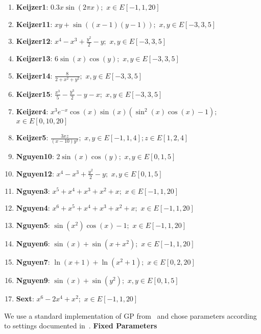 \begin{enumerate}[noitemsep]
\item \textbf{Keijzer1}: $0.3x \sin(2 \pi x);$ $x \in E[-1,1,20]$
\item \textbf{Keijzer11}: $x y+\sin((x-1)(y-1));$ $x, y \in E[-3,3,5]$
\item \textbf{Keijzer12}: $x^{4}-x^{3}+\frac{y^{2}}{2}-y;$ $x, y \in E[-3,3,5]$
\item \textbf{Keijzer13}: $6 \sin(x) \cos(y);$ $x, y \in E[-3,3,5]$
\item \textbf{Keijzer14}: $\frac{8}{2 + x^{2} + y^{2}};$ $x,y \in E[-3,3,5]$
\item \textbf{Keijzer15}: $\frac{x^{3}}{5} - \frac{y^{3}}{2} - y - x;$ $x, y \in E[-3,3,5]$
\item \textbf{Keijzer4}: $x^{3} e^{-x} \cos(x) \sin(x) (\sin^{2}(x) \cos(x) - 1);$ $x \in E[0,10,20]$
\item \textbf{Keijzer5}: $\frac{3 x z}{(x - 10) y^{2}};$ $x,y \in E[-1,1,4]; z \in E[1,2,4]$
\item \textbf{Nguyen10}: $2 \sin(x) \cos(y);$ $x,y \in E[0,1,5]$
\item \textbf{Nguyen12}: $x^{4} - x^{3} + \frac{y^{2}}{2} - y;$ $x,y \in E[0,1,5]$
\item \textbf{Nguyen3}: $x^{5} + x^{4} + x^{3} + x^{2} + x;$ $x \in E[-1,1,20]$
\item \textbf{Nguyen4}: $x^{6} + x^{5} + x^{4} + x^{3} + x^{2} + x;$ $x \in E[-1,1,20]$
\item \textbf{Nguyen5}: $\sin(x^{2}) \cos(x) - 1;$ $x \in E[-1,1,20]$
\item \textbf{Nguyen6}: $\sin(x) + \sin(x + x^{2});$ $x \in E[-1,1,20]$
\item \textbf{Nguyen7}: $\ln(x + 1) + \ln(x^{2} + 1);$ $x \in E[0,2,20]$
\item \textbf{Nguyen9}: $\sin(x) + \sin(y^{2});$ $x,y \in E[0,1,5]$
\item \textbf{Sext}: $x^{6} - 2 x^{4} + x^{2};$ $x \in E[-1,1,20]$
\end{enumerate}

We use a standard implementation of GP from~\cite{} and chose parameters according to settings documented in~\cite{krawiecGECCO14}.
\textbf{Fixed Parameters}\label{appendix:fixed_parameters}

